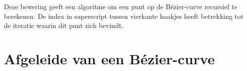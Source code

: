 \documentclass[tmi_notities.tex]{subfiles}
\begin{document}
Deze bewering geeft een algoritme om een punt op de B\'ezier-curve recursief te berekenen. De index in superscript tussen vierkante haakjes heeft betrekking tot de iteratie waarin dit punt zich bevindt.

\section{Afgeleide van een B\'ezier-curve}
\end{document}
